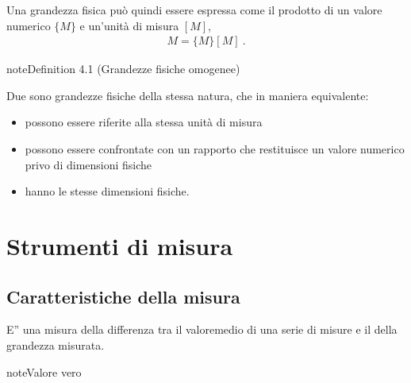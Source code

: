 \documentclass[letterpaper,10pt,italian]{jupyterBook}
\begin{document}
\sphinxAtStartPar
Una grandezza fisica può quindi essere espressa come il prodotto di un valore numerico \(\{ M \}\) e un’unità di misura \([M]\),
\begin{equation*}
\begin{split}M = \{ M \} [ M ] \ .\end{split}
\end{equation*}\label{ch/intro/measurements:definition-0}
\begin{sphinxadmonition}{note}{Definition 4.1 (Grandezze fisiche omogenee)}



\sphinxAtStartPar
Due  sono grandezze fisiche della stessa natura, che \sphinxhyphen{} in maniera equivalente:
\begin{itemize}
\item {} 
\sphinxAtStartPar
possono essere riferite alla stessa unità di misura

\item {} 
\sphinxAtStartPar
possono essere confrontate con un rapporto che restituisce un valore numerico \sphinxhyphen{} privo di dimensioni fisiche

\item {} 
\sphinxAtStartPar
hanno le stesse dimensioni fisiche.

\end{itemize}
\end{sphinxadmonition}


\section{Strumenti di misura}
\label{\detokenize{ch/intro/measurements:strumenti-di-misura}}\label{\detokenize{ch/intro/measurements:physics-hs-intro-measurements-instruments}}

\subsection{Caratteristiche della misura}
\label{\detokenize{ch/intro/measurements:caratteristiche-della-misura}}
\sphinxAtStartPar
{} E” una misura della differenza tra il valoremedio di una serie di misure e il  della grandezza misurata.

\begin{sphinxadmonition}{note}{Valore vero}

\sphinxAtStartPar
{}
\end{sphinxadmonition}
\end{document}
